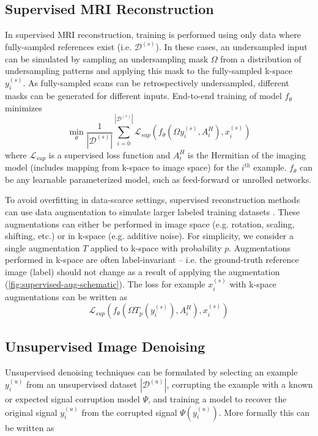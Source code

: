 \documentclass[10pt,twocolumn,letterpaper]{article}
\newcommand{\RV}[1]{{#1}}
\begin{document}
\subsection{Supervised MRI Reconstruction}
\label{sec:supervised-methods}
In supervised MRI reconstruction, training is performed using only data where fully-sampled references exist (i.e. $\mathcal{D}^{(s)}$). In these cases, an undersampled input can be simulated by sampling an undersampling mask $\Omega$ from a distribution of undersampling patterns and applying {this mask} to the fully-sampled k-space $y^{(s)}_i$. As fully-sampled scans can be retrospectively undersampled, different masks can be generated for different inputs. End-to-end training of model $f_{\theta}$ minimizes
\begin{equation}
    \min_{\theta} \frac{1}{|\mathcal{D}^{(s)}|} \sum_{\RV{i=0}}^{|\mathcal{D}^{(s)}|} \mathcal{L}_{sup}(f_{\theta}(\RV{\Omega y^{(s)}_i, A_i^H}), x^{(s)}_i)
\end{equation}
where $\mathcal{L}_{sup}$ is a supervised loss function and \RV{$A_i^H$ is the Hermitian of the imaging model (includes mapping from k-space to image space) for the $i^{th}$ example. $f_\theta$ can be any learnable parameterized model, such as feed-forward or unrolled networks.}

To avoid overfitting in data-scarce settings, supervised reconstruction methods can use data augmentation to simulate larger labeled training datasets \cite{fabian2021data}. \RV{These augmentations can either be performed in image space (e.g. rotation, scaling, shifting, etc.) or in k-space (e.g. additive noise). For simplicity, we consider a single augmentation $T$ applied to k-space with probability $p$.} Augmentations performed in k-space are often label-invariant -- \RV{i.e. the ground-truth reference image (label) should not change as a result of applying the augmentation (\cref{fig:supervised-aug-schematic})}. The loss for example $x^{(s)}_i$ with k-space augmentations can be written as
\begin{equation}
    \mathcal{L}_{sup}(f_{\theta}(\Omega T_p(y^{(s)}_i), A_i^H), x^{(s)}_i) 
\end{equation}

\subsection{Unsupervised Image Denoising}
Unsupervised denoising techniques can be formulated by selecting an example \RV{$y^{(u)}_i$} from an unsupervised dataset \RV{$|\mathcal{D}^{(u)}|$}, corrupting the example with a known or expected signal corruption model $\Psi$, and training a model to recover the original signal \RV{$y^{(u)}_i$} from the corrupted signal \RV{$\Psi(y^{(u)}_i)$}. More formally this can be written as
\end{document}
